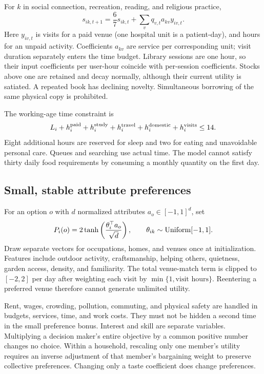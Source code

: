 \documentclass[10pt,a4paper,twocolumn]{article}
\begin{document}
For $k$ in social connection, recreation, reading, and religious practice,
\begin{equation}
 s_{ik,t+1}=\frac67s_{ik,t}+\sum_v q_{v,t}a_{kv}y_{iv,t}.
 \label{eq:stocks}
\end{equation}
Here $y_{iv,t}$ is visits for a paid venue (one hospital unit is a
patient-day), and hours for an unpaid activity. Coefficients $a_{kv}$ are
service per corresponding unit; visit duration separately enters the time
budget. Library sessions are one hour, so their input coefficients per
user-hour coincide with per-session coefficients.
Stocks above one are retained and decay normally, although their current
utility is satiated. A repeated book has declining novelty. Simultaneous
borrowing of the same physical copy is prohibited.

The working-age time constraint is
\begin{equation}
 L_i+h_i^{\rm paid}+h_i^{\rm study}+h_i^{\rm travel}
 +h_i^{\rm domestic}+h_i^{\rm visits}\leq14.
 \label{eq:time}
\end{equation}
Eight additional hours are reserved for sleep and two for eating and
unavoidable personal care. Queues and searching use actual time. The
model cannot satisfy thirty daily food requirements by consuming a
monthly quantity on the first day.

\subsection{Small, stable attribute preferences}
For an option $o$ with $d$ normalized attributes $a_o\in[-1,1]^d$, set
\begin{equation}
 P_i(o)=2\tanh\left(\frac{\theta_i^\top a_o}{\sqrt d}\right),
 \qquad \theta_{ik}\sim {\rm Uniform}[-1,1].
 \label{eq:tastes}
\end{equation}
Draw separate vectors for occupations, homes, and venues once at
initialization. Features include outdoor activity, craftsmanship,
helping others, quietness, garden access, density, and familiarity.
The total venue-match term is clipped to $[-2,2]$ per day after weighting
each visit by $\min\{1,\text{visit hours}\}$. Reentering a preferred venue
therefore cannot generate unlimited utility.

Rent, wages, crowding, pollution, commuting, and physical safety are
handled in budgets, services, time, and work costs. They must not be
hidden a second time in the small preference bonus. Interest and skill
are separate variables. Multiplying a decision maker's entire objective
by a common positive number changes no choice. Within a household,
rescaling only one member's utility requires an inverse adjustment of
that member's bargaining weight to preserve collective preferences.
Changing only a taste coefficient does change preferences.
\end{document}
